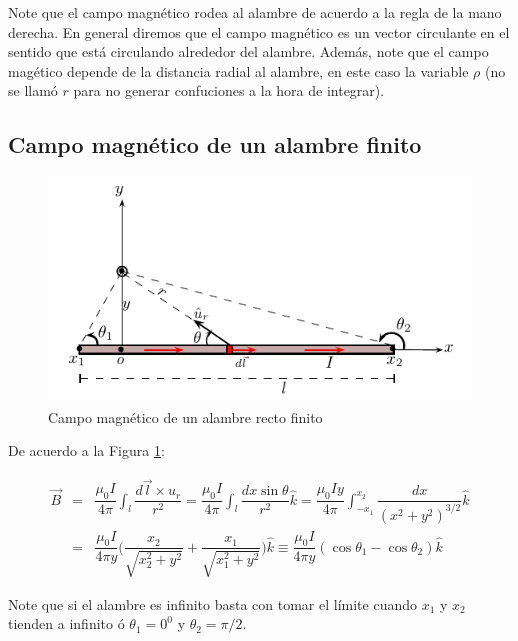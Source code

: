 Note que el campo magnético rodea al alambre de acuerdo a la regla de la mano derecha. En general diremos que el campo magnético es un vector circulante en el sentido que está circulando alrededor del alambre. Además, note que el campo magético depende de la distancia radial al alambre, en este caso la variable $\rho$ (no se llamó $r$ para no generar confuciones a la hora de integrar).

\subsection*{Campo magnético de un alambre finito}

\begin{figure}[h]
\begin{center}
\includegraphics[scale=0.8]{magnetostatica/barra4}
\end{center}
\caption{Campo magnético de un alambre recto finito}
\label{fig-alambrefinito}
\end{figure}

De acuerdo a la Figura \ref{fig-alambrefinito}:

\begin{eqnarray}
\nonumber
\vec{B}&=&\dfrac{\mu_0 I}{4\pi}\int_l \dfrac{d\vec{l}\times \hat{u}_r}{r^{2}}
=\dfrac{\mu_0 I}{4\pi}\int_l \dfrac{dx \sin\theta}{r^{2}}\hat{k} 
=\dfrac{\mu_0 I y}{4\pi}\int_{-x_1}^{x_2} \dfrac{dx}{(x^{2}+y^{2})^{3/2}}\hat{k} \\ \nonumber
&=&\dfrac{\mu_0 I }{4\pi y}\Big(\dfrac{x_2}{\sqrt{x_2^{2}+y^{2}}} + \dfrac{x_1}{\sqrt{x_1^{2}+y^{2}}}\Big)\hat{k} \equiv  \dfrac{\mu_0 I }{4\pi y}(\cos\theta_1 -\cos\theta_2)\hat{k}
\end{eqnarray}

Note que si el alambre es infinito basta con tomar el límite cuando $x_1$ y $x_2$ tienden a infinito ó $\theta_1 =0^0$ y $\theta_2=\pi/2$. 

